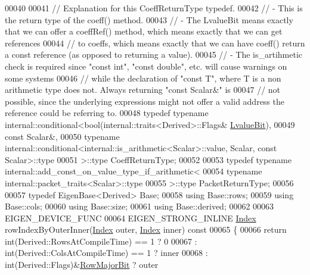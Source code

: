 \begin{DoxyCode}
00040 
00041     \textcolor{comment}{// Explanation for this CoeffReturnType typedef.}
00042     \textcolor{comment}{// - This is the return type of the coeff() method.}
00043     \textcolor{comment}{// - The LvalueBit means exactly that we can offer a coeffRef() method, which means exactly that we can
       get references}
00044     \textcolor{comment}{// to coeffs, which means exactly that we can have coeff() return a const reference (as opposed to
       returning a value).}
00045     \textcolor{comment}{// - The is\_artihmetic check is required since "const int", "const double", etc. will cause warnings on
       some systems}
00046     \textcolor{comment}{// while the declaration of "const T", where T is a non arithmetic type does not. Always returning
       "const Scalar&" is}
00047     \textcolor{comment}{// not possible, since the underlying expressions might not offer a valid address the reference could
       be referring to.}
00048     \textcolor{keyword}{typedef} \textcolor{keyword}{typename} internal::conditional<bool(internal::traits<Derived>::Flags&
      \hyperlink{group__flags_gae2c323957f20dfdc6cb8f44428eaec1a}{LvalueBit}),
00049                          \textcolor{keyword}{const} Scalar&,
00050                          \textcolor{keyword}{typename} internal::conditional<internal::is\_arithmetic<Scalar>::value, Scalar, \textcolor{keyword}{
      const} Scalar>::type
00051                      >::type CoeffReturnType;
00052 
00053     \textcolor{keyword}{typedef} \textcolor{keyword}{typename} internal::add\_const\_on\_value\_type\_if\_arithmetic<
00054                          \textcolor{keyword}{typename} internal::packet\_traits<Scalar>::type
00055                      >::type PacketReturnType;
00056 
00057     \textcolor{keyword}{typedef} EigenBase<Derived> Base;
00058     \textcolor{keyword}{using} Base::rows;
00059     \textcolor{keyword}{using} Base::cols;
00060     \textcolor{keyword}{using} Base::size;
00061     \textcolor{keyword}{using} Base::derived;
00062 
00063     EIGEN\_DEVICE\_FUNC
00064     EIGEN\_STRONG\_INLINE \hyperlink{namespace_eigen_a62e77e0933482dafde8fe197d9a2cfde}{Index} rowIndexByOuterInner(\hyperlink{namespace_eigen_a62e77e0933482dafde8fe197d9a2cfde}{Index} outer, \hyperlink{namespace_eigen_a62e77e0933482dafde8fe197d9a2cfde}{Index} inner)\textcolor{keyword}{ const}
00065 \textcolor{keyword}{    }\{
00066       \textcolor{keywordflow}{return} int(Derived::RowsAtCompileTime) == 1 ? 0
00067           : int(Derived::ColsAtCompileTime) == 1 ? inner
00068           : int(Derived::Flags)&\hyperlink{group__flags_gae4f56c2a60bbe4bd2e44c5b19cbe8762}{RowMajorBit} ? outer

\end{DoxyCode}
